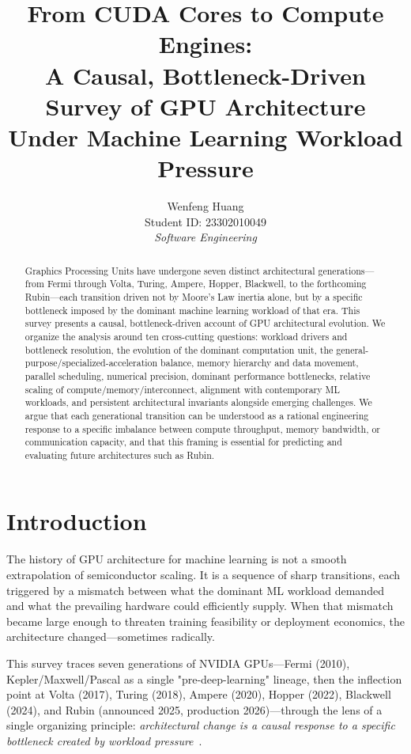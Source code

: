 \documentclass[10pt,twocolumn]{article}
\title{\textbf{From CUDA Cores to Compute Engines:\\
A Causal, Bottleneck-Driven Survey of GPU Architecture\\
Under Machine Learning Workload Pressure}}
\author{Wenfeng Huang\\
{\small Student ID: 23302010049}\\
{\small \textit{Software Engineering}}}
\date{}
\begin{document}
\maketitle

\begin{abstract}
Graphics Processing Units have undergone seven distinct architectural generations—from Fermi through Volta, Turing, Ampere, Hopper, Blackwell, to the forthcoming Rubin—each transition driven not by Moore's Law inertia alone, but by a specific bottleneck imposed by the dominant machine learning workload of that era. This survey presents a causal, bottleneck-driven account of GPU architectural evolution. We organize the analysis around ten cross-cutting questions: workload drivers and bottleneck resolution, the evolution of the dominant computation unit, the general-purpose/specialized-acceleration balance, memory hierarchy and data movement, parallel scheduling, numerical precision, dominant performance bottlenecks, relative scaling of compute/memory/interconnect, alignment with contemporary ML workloads, and persistent architectural invariants alongside emerging challenges. We argue that each generational transition can be understood as a rational engineering response to a specific imbalance between compute throughput, memory bandwidth, or communication capacity, and that this framing is essential for predicting and evaluating future architectures such as Rubin.
\end{abstract}

\section{Introduction}

The history of GPU architecture for machine learning is not a smooth extrapolation of semiconductor scaling. It is a sequence of sharp transitions, each triggered by a mismatch between what the dominant ML workload demanded and what the prevailing hardware could efficiently supply. When that mismatch became large enough to threaten training feasibility or deployment economics, the architecture changed—sometimes radically.

This survey traces seven generations of NVIDIA GPUs—Fermi (2010), Kepler/Maxwell/Pascal as a single "pre-deep-learning" lineage, then the inflection point at Volta (2017), Turing (2018), Ampere (2020), Hopper (2022), Blackwell (2024), and Rubin (announced 2025, production 2026)—through the lens of a single organizing principle: \textit{architectural change is a causal response to a specific bottleneck created by workload pressure}~\citep{jia2018dissecting,nvidia2022hopper}.
\end{document}
